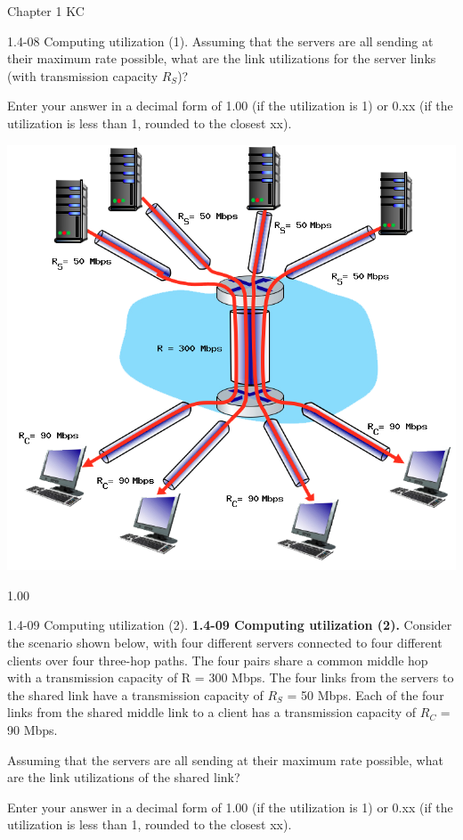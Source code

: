 \documentclass[a4paper]{article}
\begin{document}
\begin{quiz}{Chapter 1 KC}
\begin{shortanswer}[points=1,shuffle=true]{1.4-08 Computing utilization (1).}
Assuming that the servers are all sending at their maximum rate possible, what are the link utilizations for the server links (with transmission capacity $R_S$)? 

Enter your answer in a decimal form of 1.00 (if the utilization is 1) or 0.xx (if the utilization is less than 1, rounded to the closest xx). 

\begin{center}
\includegraphics[width=.7\linewidth]{figs/1.4.7.png}
\end{center}
\item 1.00
\end{shortanswer}

\begin{shortanswer}[points=1,shuffle=true]{1.4-09 Computing utilization (2).}
\textbf{1.4-09 Computing utilization (2).} 
Consider the scenario shown below, with four different servers connected to four different clients over four three-hop paths. The four pairs share a common middle hop with a transmission capacity of R = 300 Mbps. The four links from the servers to the shared link have a transmission capacity of $R_S$ = 50 Mbps. Each of the four links from the shared middle link to a client has a transmission capacity of $R_C$ = 90 Mbps. 

Assuming that the servers are all sending at their maximum rate possible, what are the link utilizations of the shared link? 

Enter your answer in a decimal form of 1.00 (if the utilization is 1) or 0.xx (if the utilization is less than 1, rounded to the closest xx). 


\end{shortanswer}
\end{quiz}
\end{document}
